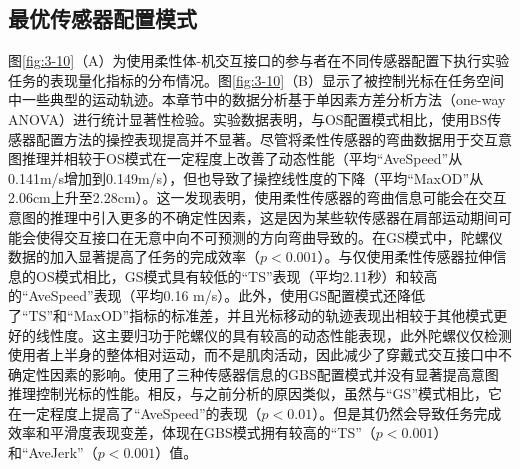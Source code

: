 \subsection{最优传感器配置模式}图\ref{fig:3-10}（A）为使用柔性体-机交互接口的参与者在不同传感器配置下执行实验任务的表现量化指标的分布情况。图\ref{fig:3-10}（B）显示了被控制光标在任务空间中一些典型的运动轨迹。本章节中的数据分析基于单因素方差分析方法（one-way ANOVA）进行统计显著性检验。实验数据表明，与OS配置模式相比，使用BS传感器配置方法的操控表现提高并不显著。尽管将柔性传感器的弯曲数据用于交互意图推理并相较于OS模式在一定程度上改善了动态性能（平均``AveSpeed''从0.141m/s增加到0.149m/s），但也导致了操控线性度的下降（平均``MaxOD''从2.06cm上升至2.28cm）。这一发现表明，使用柔性传感器的弯曲信息可能会在交互意图的推理中引入更多的不确定性因素，这是因为某些软传感器在肩部运动期间可能会使得交互接口在无意中向不可预测的方向弯曲导致的。在GS模式中，陀螺仪数据的加入显著提高了任务的完成效率（$p<0.001$）。与仅使用柔性传感器拉伸信息的OS模式相比，GS模式具有较低的``TS''表现（平均2.11秒）和较高的``AveSpeed''表现（平均0.16 m/s）。此外，使用GS配置模式还降低了``TS''和``MaxOD''指标的标准差，并且光标移动的轨迹表现出相较于其他模式更好的线性度。这主要归功于陀螺仪的具有较高的动态性能表现，此外陀螺仪仅检测使用者上半身的整体相对运动，而不是肌肉活动，因此减少了穿戴式交互接口中不确定性因素的影响。使用了三种传感器信息的GBS配置模式并没有显著提高意图推理控制光标的性能。相反，与之前分析的原因类似，虽然与``GS''模式相比，它在一定程度上提高了``AveSpeed''的表现（$p<0.01$）。但是其仍然会导致任务完成效率和平滑度表现变差，体现在GBS模式拥有较高的``TS''（$p<0.001$）和``AveJerk''（$p<0.001$）值。

